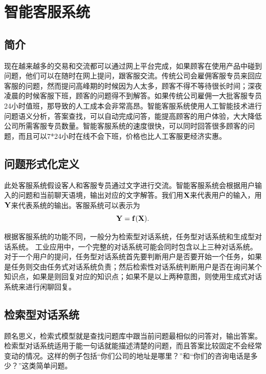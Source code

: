 %
%
%
\chapter{智能客服系统}
\label{basic} %


\section{简介}
现在越来越多的交易和交流都可以通过网上平台完成，如果顾客在使用产品中碰到问题，他们可以在随时在网上提问，跟客服交流。传统公司会雇佣客服专员来回应客服的问题，然而提问高峰期的时候因为人太多，顾客不得不等待很长时间；深夜凌晨的时候客服下班，顾客的问题得不到解答。如果传统公司雇佣一大批客服专员24小时值班，那导致的人工成本会非常高昂。智能客服系统使用人工智能技术进行问题语义分析，答案查找，可以自动完成问答，能提高顾客的用户体验，大大降低公司所需客服专员数量。智能客服系统的速度很快，可以同时回答很多顾客的问题，而且可以7*24小时在线不会下班，价格也比人工客服更经济实惠。

\section{问题形式化定义}
此处客服系统假设客人和客服专员通过文字进行交流。智能客服系统会根据用户输入的问题和当前聊天语境，输出对应的文字解答。我们用$\bf{X}$来代表用户的输入，用$\bf{Y}$来代表系统的输出。客服系统可以表示为
$$\bf{Y} = f(\bf{X}).$$

根据客服系统的功能不同，一般分为检索型对话系统，任务型对话系统\cite{young2013pomdp}和生成型对话系统\cite{sutskever2014sequence,shang2015neural,serban2016building,serban2016hierarchical}。
工业应用中，一个完整的对话系统可能会同时包含以上三种对话系统。
对于一个用户的提问，任务型对话系统首先要判断用户是否要开始一个任务，如果是任务则交由任务式对话系统负责；然后检索性对话系统判断用户是否在询问某个知识点，如果是则回复对应的知识点；如果不是以上两种意图，则使用生成式对话系统来进行闲聊回复。

\section{检索型对话系统}
顾名思义，检索式模型就是查找问题库中跟当前问题最相似的问答对，输出答案。
检索型对话系统适用于能一句话就能描述清楚的问题，而且答案比较固定不会经常变动的情况。这样的例子包括``你们公司的地址是哪里？''和``你们的咨询电话是多少？''这类简单问题。

